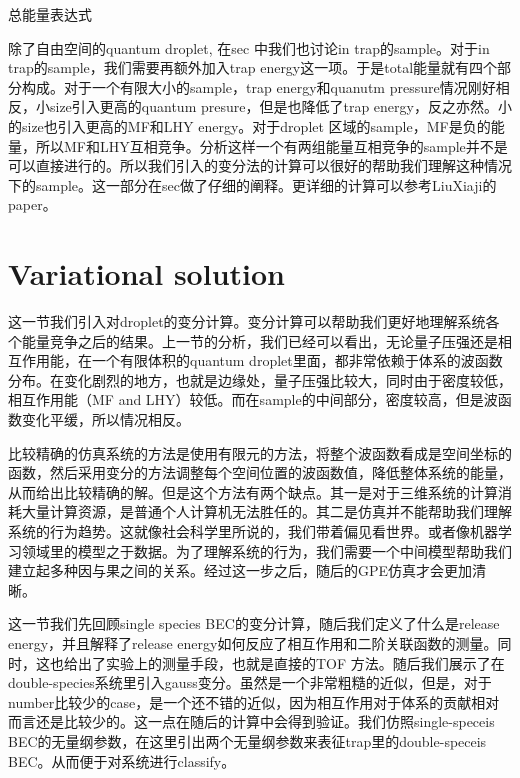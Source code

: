 总能量表达式

除了自由空间的quantum droplet, 在sec 中我们也讨论in trap的sample。对于in trap的sample，我们需要再额外加入trap energy这一项。于是total能量就有四个部分构成。对于一个有限大小的sample，trap energy和quanutm pressure情况刚好相反，小size引入更高的quantum presure，但是也降低了trap energy，反之亦然。小的size也引入更高的MF和LHY energy。对于droplet 区域的sample，MF是负的能量，所以MF和LHY互相竞争。分析这样一个有两组能量互相竞争的sample并不是可以直接进行的。所以我们引入的变分法的计算可以很好的帮助我们理解这种情况下的sample。这一部分在sec做了仔细的阐释。更详细的计算可以参考LiuXiaji的paper。


\section{Variational solution}

这一节我们引入对droplet的变分计算。变分计算可以帮助我们更好地理解系统各个能量竞争之后的结果。上一节的分析，我们已经可以看出，无论量子压强还是相互作用能，在一个有限体积的quantum droplet里面，都非常依赖于体系的波函数分布。在变化剧烈的地方，也就是边缘处，量子压强比较大，同时由于密度较低，相互作用能（MF and LHY）较低。而在sample的中间部分，密度较高，但是波函数变化平缓，所以情况相反。

比较精确的仿真系统的方法是使用有限元的方法，将整个波函数看成是空间坐标的函数，然后采用变分的方法调整每个空间位置的波函数值，降低整体系统的能量，从而给出比较精确的解。但是这个方法有两个缺点。其一是对于三维系统的计算消耗大量计算资源，是普通个人计算机无法胜任的。其二是仿真并不能帮助我们理解系统的行为趋势。这就像社会科学里所说的，我们带着偏见看世界。或者像机器学习领域里的模型之于数据。为了理解系统的行为，我们需要一个中间模型帮助我们建立起多种因与果之间的关系。经过这一步之后，随后的GPE仿真才会更加清晰。

这一节我们先回顾single species BEC的变分计算，随后我们定义了什么是release energy，并且解释了release energy如何反应了相互作用和二阶关联函数的测量。同时，这也给出了实验上的测量手段，也就是直接的TOF 方法。随后我们展示了在double-species系统里引入gauss变分。虽然是一个非常粗糙的近似，但是，对于number比较少的case，是一个还不错的近似，因为相互作用对于体系的贡献相对而言还是比较少的。这一点在随后的计算中会得到验证。我们仿照single-speceis BEC的无量纲参数，在这里引出两个无量纲参数来表征trap里的double-speceis BEC。从而便于对系统进行classify。

